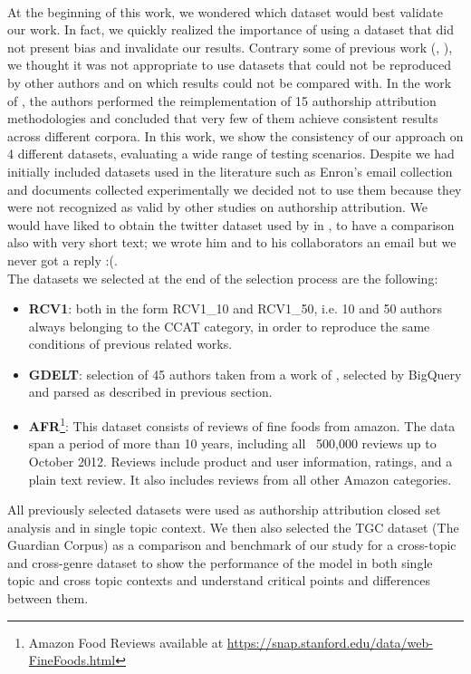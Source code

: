 \paragraph{}
At the beginning of this work, we wondered which dataset would best validate our work. In fact, we quickly realized the importance of using a dataset that did not present bias and invalidate our results. Contrary some of previous work (\cite{diederich2003authorship}, \cite{koppel2003exploiting}), we thought it was not appropriate to use datasets that could not be reproduced by other authors and on which results could not be compared with.
In the work of \citeauthor{potthast2016wrote} \cite{potthast2016wrote},
the authors performed the reimplementation of 15 authorship attribution methodologies and concluded that very few of them achieve consistent results across different corpora. In
this work, we show the consistency of our approach on 4 different datasets, evaluating a wide range of testing scenarios.\cite{posadas2017application}
Despite we had initially included datasets used in the literature such as Enron's email collection and documents collected experimentally we decided not to use them because they were not recognized as valid by other studies on authorship attribution.
We would have liked to obtain the twitter dataset used by \citeauthor{layton2010authorship} in \cite{layton2010authorship}, to have a comparison also with very short text; we wrote him and to his collaborators an email but we never got a reply :(.\\
The datasets we selected at the end of the selection process are the following:
\begin{itemize}
\item \textbf{RCV1}: both in the form RCV1\_10 and RCV1\_50, i.e. 10 and 50 authors always belonging to the CCAT category, in order to reproduce the same conditions of previous related works.
\item \textbf{GDELT}: selection of 45 authors taken from a work of \cite{gungor2018benchmarking}, selected by BigQuery and parsed as described in previous section.
\item \textbf{AFR}\footnote{Amazon Food Reviews available at \url{https://snap.stanford.edu/data/web-FineFoods.html}}: This dataset consists of reviews of fine foods from amazon. The data span a period of more than 10 years, including all ~500,000 reviews up to October 2012. Reviews include product and user information, ratings, and a plain text review. It also includes reviews from all other Amazon categories.
\end{itemize}
All previously selected datasets were used as authorship attribution closed set analysis and in single topic context.
We then also selected the TGC dataset (The Guardian Corpus) as a comparison and benchmark of our study for a cross-topic and cross-genre dataset to show the performance of the model in both single topic and cross topic contexts and understand critical points and differences between them.
